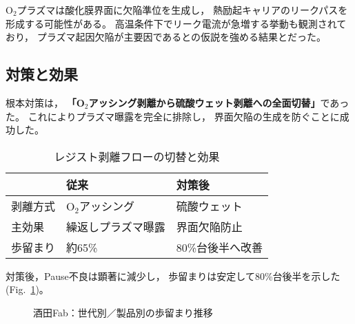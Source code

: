 \documentclass[conference]{IEEEtran}
\begin{document}
O$_2$プラズマは酸化膜界面に欠陥準位を生成し，
熱励起キャリアのリークパスを形成する可能性がある。  
高温条件下でリーク電流が急増する挙動も観測されており，
プラズマ起因欠陥が主要因であるとの仮説を強める結果とだった。

\subsection{対策と効果}
根本対策は，
\textbf{「O$_2$アッシング剥離から硫酸ウェット剥離への全面切替」}であった。  
これによりプラズマ曝露を完全に排除し，
界面欠陥の生成を防ぐことに成功した。  

\begin{table}[h]
  \centering
  \caption{レジスト剥離フローの切替と効果}
  \label{tab:resist}
  \begin{tabular}{lll}
    \toprule
    & 従来 & 対策後 \\
    \midrule
    剥離方式 & O$_2$アッシング & 硫酸ウェット \\
    主効果 & 繰返しプラズマ曝露 & 界面欠陥防止 \\
    歩留まり & 約65\% & 80\%台後半へ改善 \\
    \bottomrule
  \end{tabular}
\end{table}

対策後，Pause不良は顕著に減少し，
歩留まりは安定して80\%台後半を示した
(Fig.~\ref{fig:yield25})。  

\begin{figure}[t]
\centering
{}
\caption{酒田Fab：世代別／製品別の歩留まり推移}
\label{fig:yield25}
\end{figure}
\end{document}
